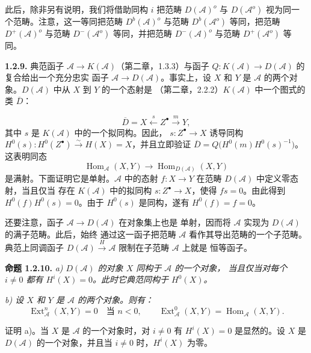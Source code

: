 \clearpage
{}%
\begingroup\small\setlength{\parskip}{0pt}\setlength{\emergencystretch}{1.5em}
\setlength{\abovedisplayskip}{4pt plus 2pt minus 2pt}%
\setlength{\belowdisplayskip}{4pt plus 2pt minus 2pt}%

此后，除非另有说明，我们将借助同构 $i$ 把范畴 $D(\mathcal A)^o$ 与
$D(\mathcal A^o)$ 视为同一个范畴。注意，这一等同把范畴
$D^b(\mathcal A)^o$ 与范畴 $D^b(\mathcal A^o)$ 等同，把范畴
$D^+(\mathcal A)^o$ 与范畴 $D^-(\mathcal A^o)$ 等同，并把范畴
$D^-(\mathcal A)^o$ 与范畴 $D^+(\mathcal A^o)$ 等同。

\medskip\noindent\textbf{1.2.9.}\quad
典范函子 $\mathcal A\longrightarrow K(\mathcal A)$（第二章，1.3.3）与函子
$Q\colon K(\mathcal A)\longrightarrow D(\mathcal A)$ 的复合给出一个充分忠实
函子 $\mathcal A\longrightarrow D(\mathcal A)$。事实上，设 $X$ 和 $Y$ 是
$\mathcal A$ 的两个对象。$D(\mathcal A)$ 中从 $X$ 到 $Y$ 的一个态射是
（第二章，2.2.2）$K(\mathcal A)$ 中一个图式的类 $\overline D$：

\[
\overline D=X\xleftarrow{\ s\ }Z^\bullet\xrightarrow{\ m\ }Y,
\]
其中 $s$ 是 $K(\mathcal A)$ 中的一个拟同构。因此，
$s\colon Z^\bullet\longrightarrow X$ 诱导同构
$H^0(s)\colon H^0(Z^\bullet)\xrightarrow{\sim}H(X)=X$，并且立即验证
$\overline D=Q\bigl(H^0(m)H^0(s)^{-1}\bigr)$。这表明同态
\[
\operatorname{Hom}_{\mathcal A}(X,Y)\longrightarrow
\operatorname{Hom}_{D(\mathcal A)}(X,Y)
\]
是满射。下面证明它是单射。$\mathcal A$ 中的态射
$f\colon X\longrightarrow Y$ 在范畴 $D(\mathcal A)$ 中定义零态射，当且仅当
存在 $K(\mathcal A)$ 中的拟同构 $s\colon Z^\bullet\longrightarrow X$，使得
$fs=0$。由此得到 $H^0(f)H^0(s)=0$。由于 $H^0(s)$ 是同构，遂有
$H^0(f)=f=0$。

还要注意，函子 $\mathcal A\longrightarrow D(\mathcal A)$ 在对象集上也是
单射，因而将 $\mathcal A$ 实现为 $D(\mathcal A)$ 的满子范畴。此后，始终
通过这一函子把范畴 $\mathcal A$ 看作其导出范畴的一个子范畴。典范上同调函子
$D(\mathcal A)\xrightarrow{H}\mathcal A$ 限制在子范畴 $\mathcal A$ 上就是
恒等函子。

\medskip\noindent\textbf{命题 1.2.10.}\quad
\textit{a) $D(\mathcal A)$ 的对象 $X$ 同构于 $\mathcal A$ 的一个对象，
当且仅当对每个 $i\neq0$ 都有 $H^i(X)=0$。此时它典范同构于 $H^0(X)$。}

\noindent\textit{b) 设 $X$ 和 $Y$ 是 $\mathcal A$ 的两个对象。则有：}
\[
\operatorname{Ext}_{\mathcal A}^{n}(X,Y)=0\quad\text{当 }n<0,
\qquad
\operatorname{Ext}_{\mathcal A}^{0}(X,Y)
=\operatorname{Hom}_{\mathcal A}(X,Y).
\]

证明 a)。当 $X$ 是 $\mathcal A$ 的一个对象时，对 $i\neq0$ 有
$H^i(X)=0$ 是显然的。设 $X$ 是 $D(\mathcal A)$ 的一个对象，并且当
$i\neq0$ 时，$H^i(X)$ 为零。
\endgroup

